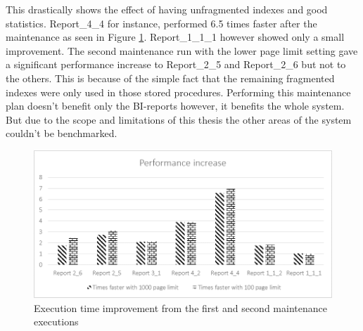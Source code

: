 \documentclass{cslthse-msc}
\begin{document}
\noindent This drastically shows the effect of having unfragmented indexes and good statistics. Report\_4\_4 for instance, performed 6.5 times faster after the maintenance as seen in Figure \ref{fig:beforeaftertimes}. Report\_1\_1\_1 however showed only a small improvement. The second maintenance run with the lower page limit setting gave a significant performance increase to Report\_2\_5 and Report\_2\_6 but not to the others. This is because of the simple fact that the remaining fragmented indexes were only used in those stored procedures. Performing this maintenance plan doesn't benefit only the BI-reports however, it benefits the whole system. But due to the scope and limitations of this thesis the other areas of the system couldn't be benchmarked.

\begin{figure}[H]
\begin{center}
\includegraphics[scale=1]{Pictures/beforeAndAfterMaintenancetimes.png}
\caption{Execution time improvement from the first and second maintenance executions}
\label{fig:beforeaftertimes}
\end{center}
\end{figure}
\end{document}
